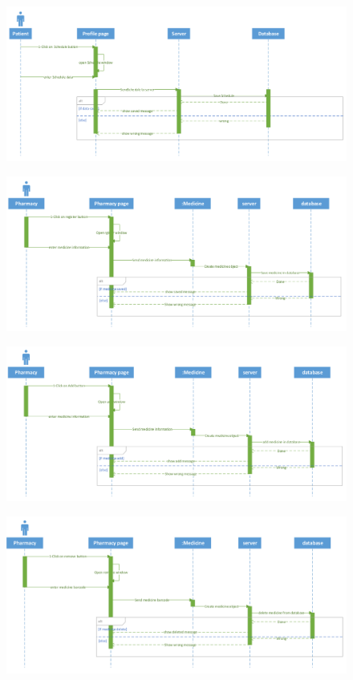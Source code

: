 \documentclass[]{article}
\begin{document}
\begin{figure}[H]
\centering
\includegraphics[scale=0.3]{./sequence/18}
\end{figure}
\begin{figure}[H]
\centering
\includegraphics[scale=0.3]{./sequence/19}
\end{figure}
\begin{figure}[H]
\centering
\includegraphics[scale=0.3]{./sequence/20}
\end{figure}
\begin{figure}[H]
\centering
\includegraphics[scale=0.3]{./sequence/21}
\end{figure}
\end{document}
